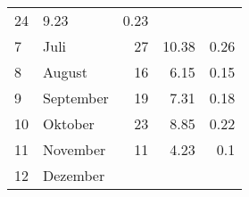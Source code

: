 \begin{longtable}{lXrrr}
       \num{24} &
       \num[round-mode=places,round-precision=2]{9,23} &
         \num[round-mode=places,round-precision=2]{0,23} \\

     7 &
     \multicolumn{1}{X}{ Juli   } &


       \num{27} &
       \num[round-mode=places,round-precision=2]{10,38} &
         \num[round-mode=places,round-precision=2]{0,26} \\

     8 &
     \multicolumn{1}{X}{ August   } &


       \num{16} &
       \num[round-mode=places,round-precision=2]{6,15} &
         \num[round-mode=places,round-precision=2]{0,15} \\

     9 &
     \multicolumn{1}{X}{ September   } &


       \num{19} &
       \num[round-mode=places,round-precision=2]{7,31} &
         \num[round-mode=places,round-precision=2]{0,18} \\

     10 &
     \multicolumn{1}{X}{ Oktober   } &


       \num{23} &
       \num[round-mode=places,round-precision=2]{8,85} &
         \num[round-mode=places,round-precision=2]{0,22} \\

     11 &
     \multicolumn{1}{X}{ November   } &


       \num{11} &
       \num[round-mode=places,round-precision=2]{4,23} &
         \num[round-mode=places,round-precision=2]{0,1} \\

     12 &
     \multicolumn{1}{X}{ Dezember   } &



\end{longtable}
